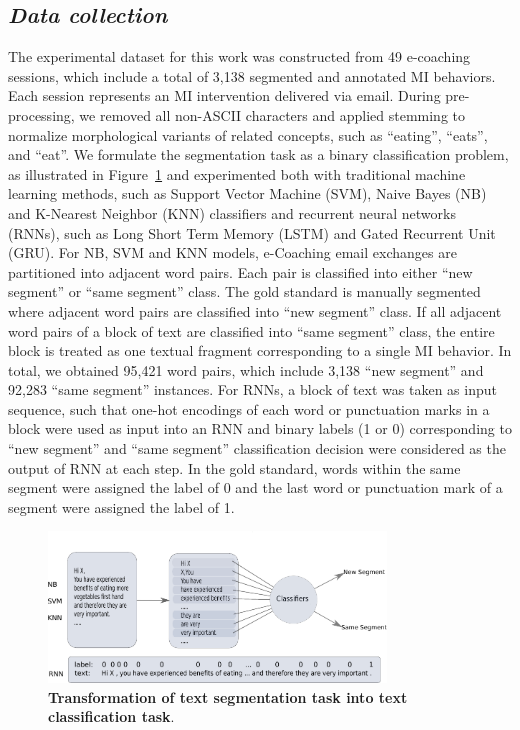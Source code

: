 \documentclass{amia}
\begin{document}
\subsection*{\textit{Data collection}}
The experimental dataset for this work was constructed from 49 e-coaching sessions, which include a total of 3,138 segmented and annotated MI behaviors. Each session represents an MI intervention delivered via email. During pre-processing, we removed all non-ASCII characters and applied stemming to normalize morphological variants of related concepts, such as ``eating'', ``eats'', and ``eat''. We formulate the segmentation task as a binary classification problem, as illustrated in Figure~\ref{fig:classifier} and experimented both with traditional machine learning methods, such as Support Vector Machine (SVM), Naive Bayes (NB) and K-Nearest Neighbor (KNN) classifiers and recurrent neural networks (RNNs), such as Long Short Term Memory (LSTM) and Gated Recurrent Unit (GRU). For NB, SVM and KNN models, e-Coaching email exchanges are partitioned into adjacent word pairs. Each pair is classified into either ``new segment'' or ``same segment'' class. The gold standard is manually segmented where adjacent word pairs are classified into ``new segment'' class. If all adjacent word pairs of a block of text are classified into ``same segment'' class, the entire block is treated as one textual fragment corresponding to a single MI behavior. In total, we obtained 95,421 word pairs, which include 3,138 ``new segment'' and 92,283 ``same segment'' instances. For RNNs, a block of text was taken as input sequence, such that one-hot encodings of each word or punctuation marks in a block were used as input into an RNN and binary labels (1 or 0) corresponding to ``new segment'' and ``same segment'' classification decision were considered as the output of RNN at each step. In the gold standard, words within the same segment were assigned the label of 0 and the last word or punctuation mark of a segment were assigned the label of 1.    

\begin{figure}[!htb]
    \centering
    \includegraphics[width=0.80\textwidth]{figures/classifier.pdf}
    \caption{\textbf{Transformation of text segmentation task into text classification task}.}
    \label{fig:classifier}
\end{figure}
\end{document}
